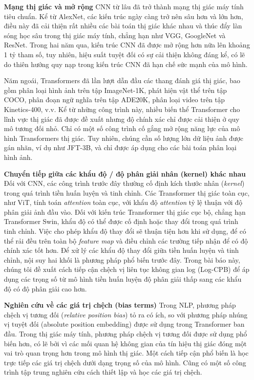 \documentclass[times, twocolumn]{zHenriquesLab-StyleBioRxiv}
\begin{document}
\vspace*{5mm}
\textbf{Mạng thị giác và mở rộng} CNN từ lâu đã trở thành mạng thị giác máy tính tiêu chuẩn. Kể từ AlexNet, các kiến trúc ngày càng trở nên sâu hơn và lớn hơn, điều này đã cải thiện rất nhiều các bài toán thị giác khác nhau và thúc đẩy làn sóng học sâu trong thị giác máy tính, chẳng hạn như VGG, GoogleNet và ResNet. Trong hai năm qua, kiến trúc CNN đã được mở rộng hơn nữa lên khoảng 1 tỷ tham số, tuy nhiên, hiệu suất tuyệt đối có sự cải thiện không đáng kể, có lẽ do thiên hướng quy nạp trong kiến trúc CNN đã hạn chế sức mạnh của mô hình.

\vspace*{5mm}
Năm ngoái, Transformers đã lần lượt dẫn đầu các thang đánh giá thị giác, bao gồm phân loại hình ảnh trên tập ImageNet-1K, phát hiện vật thể trên tập COCO, phân đoạn ngữ nghĩa trên tập ADE20K, phân loại video trên tập Kinetics-400, v.v. Kể từ những công trình này, nhiều biến thể Transformer cho lĩnh vực thị giác đã được đề xuất nhưng độ chính xác chỉ được cải thiện ở quy mô tương đối nhỏ. Chỉ có một số công trình cố gắng mở rộng năng lực của mô hình Transformers thị giác. Tuy nhiên, chúng cần số lượng lớn dữ liệu ảnh được gán nhãn, ví dụ như JFT-3B, và chỉ được áp dụng cho các bài toán phân loại hình ảnh.

\vspace*{5mm}
\textbf{Chuyển tiếp giữa các khẩu độ / độ phân giải nhân (kernel) khác nhau} Đối với CNN, các công trình trước đây thường cố định kích thước nhân (\textit{kernel}) trong quá trình tiền huấn luyện và tinh chỉnh. Các Transformer thị giác toàn cục, như ViT, tính toán \textit{attention} toàn cục, với khẩu độ \textit{attention} tỷ lệ thuận với độ phân giải ảnh đầu vào. Đối với kiến trúc Transformer thị giác cục bộ, chẳng hạn Transformer Swin, khẩu độ có thể được cố định hoặc thay đổi trong quá trình tinh chỉnh. Việc cho phép khẩu độ thay đổi sẽ thuận tiện hơn khi sử dụng, để có thể rải đều trên toàn bộ \textit{feature map} và điều chỉnh các trường tiếp nhận để có độ chính xác tốt hơn. Để xử lý các khẩu độ thay đổi giữa tiền huấn luyện và tinh chỉnh, nội suy hai khối là phương pháp phổ biến trước đây. Trong bài báo này, chúng tôi đề xuất cách tiếp cận chệch vị liên tục không gian log (Log-CPB) để áp dụng các trọng số từ mô hình tiền huấn luyện độ phân giải thấp sang các khẩu độ có độ phân giải cao hơn.

\vspace*{5mm}
\textbf{Nghiên cứu về các giá trị chệch (bias terms)} Trong NLP, phương pháp chệch vị tương đối (\textit{relative position bias}) tỏ ra có ích, so với phương pháp nhúng vị tuyệt đối (absolute position embedding) được sử dụng trong Transformer ban đầu. Trong thị giác máy tính, phương pháp chệch vị tương đối được sử dụng phổ biến hơn, có lẽ bởi vì các mối quan hệ không gian của tín hiệu thị giác đóng một vai trò quan trọng hơn trong mô hình thị giác. Một cách tiếp cận phổ biến là học trực tiếp các giá trị chệch dưới dạng trọng số của mô hình. Cũng có một số công trình tập trung nghiên cứu cách thiết lập và học các giá trị chệch.
\end{document}
